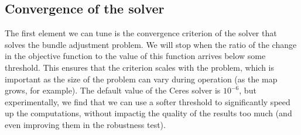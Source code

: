 \subsection{Convergence of the solver}
The first element we can tune is the convergence criterion of the solver that solves the bundle adjustment problem. We will stop when the ratio of the change in the objective function to the value of this function arrives below some threshold. This ensures that the criterion scales with the problem, which is important as the size of the problem can vary during operation (as the map grows, for example). The default value of the Ceres solver is $10^{-6}$, but experimentally, we find that we can use a softer threshold to significantly speed up the computations, without impactig the quality of the results too much (and even improving them in the robustness test).

